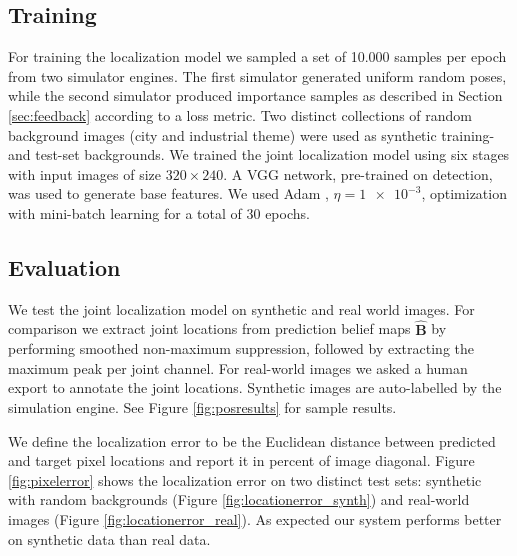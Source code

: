 \documentclass[conference]{IEEEtran}
\begin{document}
    \subsection{Training}
    For training the localization model we sampled a set of 10.000 samples per epoch from two simulator engines. The first simulator generated uniform random poses, while the second simulator produced importance samples as described in Section \ref{sec:feedback} according to a loss metric. Two distinct collections of random background images (city and industrial theme) were used as synthetic training- and test-set backgrounds. We trained the joint localization model using six stages with input images of size $320 \times 240$. A VGG network, pre-trained on detection, was used to generate base features. We used Adam \cite{kingma2014adam}, $\eta=\num{1e-3}$, optimization with mini-batch learning for a total of 30 epochs.

    \subsection{Evaluation}
    We test the joint localization model on synthetic and real world images. For comparison we extract joint locations from prediction belief maps $\hat{\mathbf{B}}$ by performing smoothed non-maximum suppression, followed by extracting the maximum peak per joint channel. For real-world images we asked a human export to annotate the joint locations. Synthetic images are auto-labelled by the simulation engine. See Figure \ref{fig:posresults} for sample results.
    
    We define the localization error to be the Euclidean distance between predicted and target pixel locations and report it in percent of image diagonal. Figure \ref{fig:pixelerror} shows the localization error on two distinct test sets: synthetic with random backgrounds (Figure \ref{fig:locationerror_synth}) and real-world images (Figure \ref{fig:locationerror_real}). As expected our system performs better on synthetic data than real data. 
\end{document}
